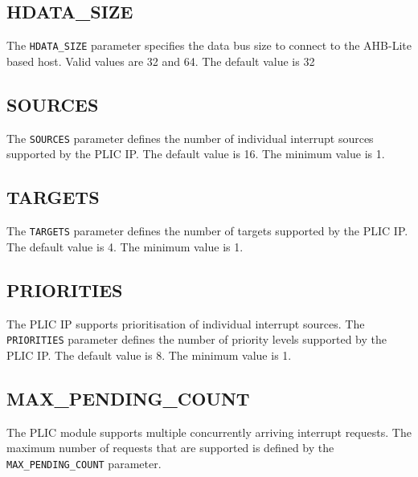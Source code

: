\subsection{HDATA\_SIZE}

The \texttt{HDATA\_SIZE} parameter specifies the data bus size to
connect to the AHB-Lite based host. Valid values are 32 and 64. The
default value is 32

\hypertarget{SOURCES}{\subsection{SOURCES}\label{sec:SOURCES}}

The \texttt{SOURCES} parameter defines the number of individual
interrupt sources supported by the PLIC IP. The default value is 16. The
minimum value is 1.

\hypertarget{TARGETS}{\subsection{TARGETS}\label{sec:TARGETS}}

The \texttt{TARGETS} parameter defines the number of targets supported
by the PLIC IP. The default value is 4. The minimum value is 1.

\subsection{PRIORITIES}

The PLIC IP supports prioritisation of individual interrupt sources. The \texttt{PRIORITIES} parameter defines the number of priority levels supported by the PLIC IP. The default value is 8. The minimum value is 1.

\subsection{MAX\_PENDING\_COUNT}

The PLIC module supports multiple concurrently arriving interrupt
requests. The maximum number of requests that are supported is defined
by the \texttt{MAX\_PENDING\_COUNT} parameter.

\begin{comment}
This is unclear.
The MAX_PENDING_COUNT parameter determines how many edge triggered interrupts can be queued. This is per interrupt-source. Each interrupt-source has an interrupt-pending-counter. MAX_PENDING_COUNT indicates the max.number this counter can hold.
If there are more interrupts pending than the counter can hold, then the counter retains its value (ie it 'hit' a ceiling).
The minimum value, of course, is 0, which indicates no pending interrupt.
\end{comment}


